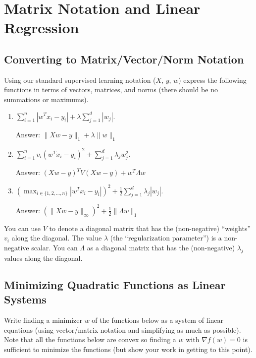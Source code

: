 \documentclass{article}
\def\ans#1{\par\gre{Answer: #1}}
\def\blu#1{{\color{blu}#1}}
\def\gre#1{{\color{gre}#1}}
\def\norm#1{\|#1\|}
\def\half{\frac 1 2}
\def\enum#1{\begin{enumerate}#1\end{enumerate}}
\begin{document}
\pagebreak



\section{Matrix Notation and Linear Regression}

\subsection{Converting to Matrix/Vector/Norm Notation}

Using our standard supervised learning notation ($X$, $y$, $w$)
express the following functions in terms of vectors, matrices, and norms (there should be no summations or maximums).
\blu{\enum{
\item $\sum_{i=1}^n  |w^Tx_i - y_i| + \lambda \sum_{j=1}^{d} |w_j|$.
\ans{$\norm{Xw-y}_1 + \lambda \norm{w}_1$}
\item $\sum_{i=1}^n v_i (w^Tx_i - y_i)^2 + \sum_{j=1}^{d} \lambda_j w_j^2$.
\ans{$(Xw-y)^T V (Xw-y) + w^T \Lambda w$}
\item $\left(\max_{i \in \{1,2,\dots,n\}} |w^Tx_i - y_i|\right)^2 +  \half\sum_{j=1}^{d} \lambda_j|w_j|$.
\ans{$(\norm{Xw-y}_\infty)^2 + \half \norm{\Lambda w}_1$}
}}
You can use $V$ to denote a diagonal matrix that has the (non-negative) ``weights'' $v_i$ along the diagonal. The value $\lambda$ (the ``regularization parameter'') is a non-negative scalar. You can $\Lambda$ as a diagonal matrix that has the (non-negative) $\lambda_j$ values along the diagonal.


\pagebreak

\subsection{Minimizing Quadratic Functions as Linear Systems}

Write finding a minimizer $w$ of the functions below as a system of linear equations (using vector/matrix notation and simplifying as much as possible). Note that all the functions below are convex  so finding a $w$ with $\nabla f(w) = 0$ is sufficient to minimize the functions (but show your work in getting to this point).
\end{document}
